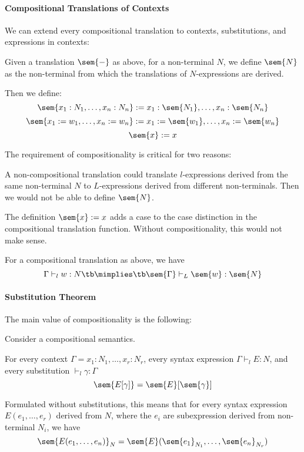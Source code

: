 \paragraph{Compositional Translations of Contexts}
We can extend every compositional translation to contexts, substitutions, and expressions in contexts:

\begin{definition}
Given a translation $\sem{-}$ as above, for a non-terminal $N$, we define $\sem{N}$ as the non-terminal from which the translations of $N$-expressions are derived.

Then we define:
\[\sem{x_1:N_1,\ldots,x_n:N_n}:=x_1:\sem{N_1},\ldots,x_n:\sem{N_n}\]
\[\sem{x_1:=w_1,\ldots,x_n:=w_n}:=x_1:=\sem{w_1},\ldots,x_n:=\sem{w_n}\]
\[\sem{x}:=x\]
\end{definition}

The requirement of compositionality is critical for two reasons:
\begin{compactitem}
\item A non-compositional translation could translate $l$-expressions derived from the same non-terminal $N$ to $L$-expressions derived from different non-terminals. Then we would not be able to define $\sem{N}$.
\item The definition $\sem{x}:=x$ adds a case to the case distinction in the compositional translation function.
Without compositionality, this would not make sense.
\end{compactitem}

\begin{theorem}
For a compositional translation as above, we have
  \[\Gamma\vdash_l w:N \tb\mimplies\tb \sem{\Gamma}\vdash_L \sem{w}:\sem{N}\]
\end{theorem}

\paragraph{Substitution Theorem}
The main value of compositionality is the following:
\begin{theorem}
Consider a compositional semantics.

For every context $\Gamma=x_1:N_1,\ldots,x_r:N_r$, every syntax expression $\Gamma \vdash_l E:N$,
and every substitution $\vdash_l \gamma:\Gamma$
\[\sem{E[\gamma]}=\sem{E}[\sem{\gamma}]\]
\end{theorem}

Formulated without substitutions, this means that for every syntax expression $E(e_1,\ldots,e_r)$ derived from $N$, where the $e_i$ are subexpression derived from non-terminal $N_i$, we have
\[\sem{E(e_1,\ldots,e_n)}_N=\sem{E}(\sem{e_1}_{N_1},\ldots,\sem{e_n}_{N_r})\]

